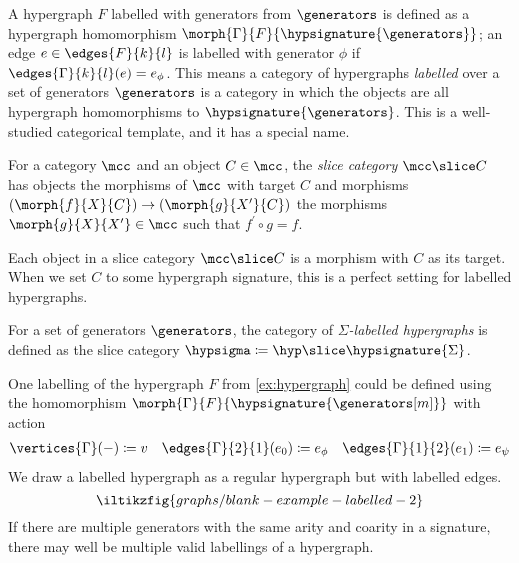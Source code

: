 A hypergraph \(F\) labelled with generators from \(\generators\) is defined
as a hypergraph homomorphism \(\morph{\Gamma}{F}{\hypsignature{\generators}}\);
an edge \(e \in \edges{F}{k}{l}\) is labelled with generator
\(\phi\) if \(\edges{\Gamma}{k}{l}(e) = e_\phi\).
This means a category of hypergraphs \emph{labelled} over a set of generators
\(\generators\) is a category in which the objects are all hypergraph
homomorphisms to \(\hypsignature{\generators}\).
This is a well-studied categorical template, and it has a special name.

\begin{definition}\label{def:slice-category}
    For a category \(\mcc\) and an object \(C \in \mcc\), the
    \emph{slice category} \(\mcc \slice C\) has objects the morphisms of
    \(\mcc\) with target \(C\) and morphisms
    \((\morph{f}{X}{C}) \to (\morph{g}{X^\prime}{C})\) the morphisms
    \(\morph{g}{X}{X^\prime} \in \mcc\) such that \(f^\prime\circ g = f\).
\end{definition}

Each object in a slice category \(\mcc \slice C\) is a morphism with \(C\) as
its target.
When we set \(C\) to some hypergraph signature, this is a perfect setting for
labelled hypergraphs.

\begin{definition}
    For a set of generators \(\generators\), the category of
    \emph{\(\Sigma\)-labelled hypergraphs} is defined as the slice category
    \(\hypsigma \coloneqq \hyp \slice \hypsignature{\Sigma}\).
\end{definition}

\begin{example}\label{ex:labelled-hypergraph}
    One labelling of the hypergraph \(F\) from \cref{ex:hypergraph} could be
    defined using the homomorphism
    \(\morph{\Gamma}{F}{\hypsignature{\generators[m]}}\) with action
    \begin{gather*}
        \vertices{\Gamma}(-) \coloneqq v
        \quad
        \edges{\Gamma}{2}{1}(e_0) \coloneqq e_\phi
        \quad
        \edges{\Gamma}{1}{2}(e_1) \coloneqq e_\psi
    \end{gather*}
    We draw a labelled hypergraph as a regular hypergraph but with labelled
    edges.
    \[
        \iltikzfig{graphs/blank-example-labelled-2}
    \]
    If there are multiple generators with the same arity and coarity
    in a signature, there may well be multiple valid labellings of a hypergraph.
\end{example}

